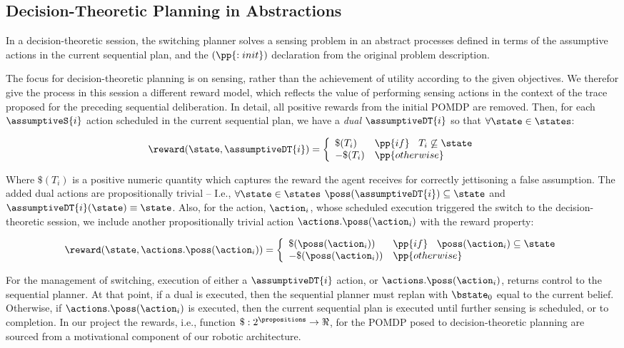 \subsection{Decision-Theoretic Planning in Abstractions}

In a decision-theoretic session, the switching planner solves a sensing
problem in an abstract processes defined in terms of the assumptive
actions in the current sequential plan, and the $(\pp{:init})$ declaration
from the original problem description. 

The focus for decision-theoretic planning is on sensing, rather than
the achievement of utility according to the given objectives. We
therefor give the process in this session a different reward model, which
reflects the value of performing sensing actions in the context of the
trace proposed for the preceding sequential deliberation. In detail,
all positive rewards from the initial POMDP are removed. Then, for
each $\assumptiveS{i}$ action scheduled in the current sequential
plan, we have a {\em dual} $\assumptiveDT{i}$ so that
$\forall\state\in\states$:

\[
\reward(\state, \assumptiveDT{i}) = \bigg\{ \begin{array}{ll}
\$(T_i) & \pp{if}~\;\;T_i \not\subseteq \state \\
-\$(T_i) & \pp{otherwise} \\
\end{array}
\]

\noindent Where $\$(T_i)$ is a positive numeric quantity which
captures the reward the agent receives for correctly jettisoning a
false assumption. The added dual actions are propositionally trivial
-- I.e., $\forall\state\in\states$ $\poss(\assumptiveDT{i})
\subseteq \state$ and $\assumptiveDT{i}(\state) \equiv \state$.  Also, for the action,
$\action_i$, whose scheduled execution triggered the switch to the
decision-theoretic session, we include another propositionally trivial
action $\actions.\poss(\action_i)$ with the reward property:

\[
\reward(\state, \actions.\poss(\action_i)) = \bigg\{ \begin{array}{ll}
\$(\poss(\action_i)) & \pp{if}~\;\; \poss(\action_i) \subseteq \state \\
-\$(\poss(\action_i)) & \pp{otherwise} \\
\end{array}
\]


For the management of switching, execution of either a
$\assumptiveDT{i}$ action, or $\actions.\poss(\action_i)$, returns
control to the sequential planner. At that point, if a dual is
executed, then the sequential planner must replan with $\bstate_0$
equal to the current belief. Otherwise, if $\actions.\poss(\action_i)$
is executed, then the current sequential plan is executed until
further sensing is scheduled, or to completion. In our project the
rewards, i.e., function $\$:2^\propositions\to\Re$, for the POMDP
posed to decision-theoretic planning are sourced from a motivational
component of our robotic architecture.

